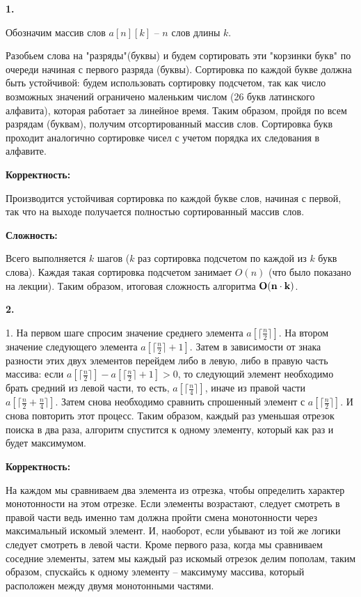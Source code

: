 \documentclass[12pt]{extreport}
\begin{document}
{\bf 1.} 

Обозначим массив слов $a[n][k]$ -- $n$ слов длины $k$. 

Разобьем слова на "разряды"(буквы) и будем сортировать эти "корзинки букв" по очереди начиная с первого разряда (буквы). Сортировка по каждой букве должна быть устойчивой: будем использовать сортировку подсчетом, так как число возможных значений ограничено маленьким числом (26 букв латинского алфавита), которая работает за линейное время. Таким образом, пройдя по всем разрядам (буквам), получим отсортированный массив слов. Сортировка букв проходит аналогично сортировке чисел с учетом порядка их следования в алфавите. 

\bigskip 
{\bf Корректность:}

Производится устойчивая сортировка по каждой букве слов, начиная с первой, так что на выходе получается полностью сортированный массив слов.

\bigskip 
{\bf Сложность:} 

Всего выполняется $k$ шагов ($k$ раз сортировка подсчетом по каждой из $k$ букв слова). Каждая такая сортировка подсчетом занимает $O(n)$ (что было показано на лекции). Таким образом, итоговая сложность алгоритма $\bf{O(n \cdot k)}$.

\bigskip

{\bf 2.} 

1. На первом шаге спросим значение среднего элемента $a[\lceil \frac{n}{2}\rceil ]$. На втором значение следующего элемента $a[\lceil \frac{n}{2}\rceil + 1]$. Затем в зависимости от знака разности этих двух элементов перейдем либо в левую, либо в правую часть массива: если $a[\lceil \frac{n}{2}\rceil ] - a[\lceil \frac{n}{2}\rceil + 1]  > 0$, то следующий элемент необходимо брать средний из левой части, то есть, $a[\lceil \frac{n}{4}\rceil ]$, иначе из правой части $a[\lceil \frac{n}{2}+ \frac{n}{4}\rceil ]$. Затем снова необходимо сравнить спрошенный элемент с $a[\lceil \frac{n}{2}\rceil ]$. И снова повторить этот процесс. Таким образом, каждый раз уменьшая отрезок поиска в два раза, алгоритм спустится к одному элементу, который как раз и будет максимумом. 

\bigskip 
{\bf Корректность:}

На каждом мы сравниваем два элемента из отрезка, чтобы определить характер монотонности на этом отрезке. Если элементы возрастают, следует смотреть в правой части ведь именно там должна пройти смена монотонности через максимальный искомый элемент. И, наоборот, если убывают из той же логики следует смотреть в левой части. Кроме первого раза, когда мы сравниваем соседние элементы, затем мы каждый раз искомый отрезок делим пополам, таким образом, спускайсь к одному элементу -- максимуму массива, который расположен между двумя монотонными частями. 
\end{document}
